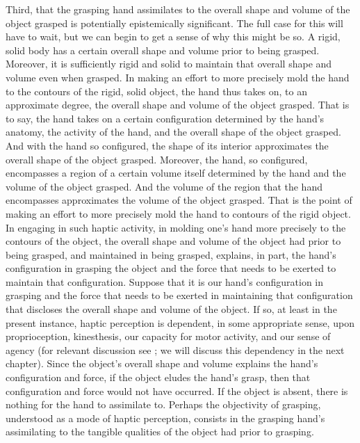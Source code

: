 Third, that the grasping hand assimilates to the overall shape and volume of the object grasped is potentially epistemically significant. The full case for this will have to wait, but we can begin to get a sense of why this might be so. A rigid, solid body has a certain overall shape and volume prior to being grasped. Moreover, it is sufficiently rigid and solid to maintain that overall shape and volume even when grasped. In making an effort to more precisely mold the hand to the contours of the rigid, solid object, the hand thus takes on, to an approximate degree, the overall shape and volume of the object grasped. That is to say, the hand takes on a certain configuration determined by the hand's anatomy, the activity of the hand, and the overall shape of the object grasped. And with the hand so configured, the shape of its interior approximates the overall shape of the object grasped. Moreover, the hand, so configured, encompasses a region of a certain volume itself determined by the hand and the volume of the object grasped. And the volume of the region that the hand encompasses approximates the volume of the object grasped. That is the point of making an effort to more precisely mold the hand to contours of the rigid object. In engaging in such haptic activity, in molding one's hand more precisely to the contours of the object, the overall shape and volume of the object had prior to being grasped, and maintained in being grasped, explains, in part, the hand's configuration in grasping the object and the force that needs to be exerted to maintain that configuration. Suppose that it is our hand's configuration in grasping and the force that needs to be exerted in maintaining that configuration that discloses the overall shape and volume of the object. If so, at least in the present instance, haptic perception is dependent, in some appropriate sense, upon proprioception, kinesthesis, our capacity for motor activity, and our sense of agency (for relevant discussion see \citealt{OShaughnessy:1989zp,OShaughnessy:1995ty,Martin:1992aa,Fulkerson:2014ek}; we will discuss this dependency in the next chapter). Since the object's overall shape and volume explains the hand's configuration and force, if the object eludes the hand's grasp, then that configuration and force would not have occurred. If the object is absent, there is nothing for the hand to assimilate to. Perhaps the objectivity of grasping, understood as a mode of haptic perception, consists in the grasping hand's assimilating to the tangible qualities of the object had prior to grasping.

